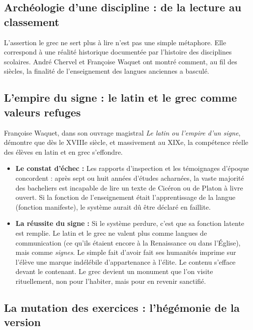 \subsection{Archéologie d'une discipline : de la lecture au classement}

L'assertion \og le grec ne sert plus à lire\fg{} n'est pas une simple métaphore. Elle correspond à
une réalité historique documentée par l'histoire des disciplines scolaires. André Chervel et
Françoise Waquet ont montré comment, au fil des siècles, la finalité de l'enseignement des langues
anciennes a basculé.



\subsection{L'empire du signe : le latin et le grec comme valeurs refuges}

Françoise Waquet, dans son ouvrage magistral \textit{Le latin ou l'empire d'un signe}, démontre que
dès le XVIIIe siècle, et massivement au XIXe, la compétence réelle des élèves en latin et en grec
s'effondre.

\begin{itemize}\item \textbf{Le constat d'échec :} Les rapports d'inspection et les témoignages d'époque concordent : après sept ou huit années d'études acharnées, la vaste majorité des bacheliers est incapable de lire un texte de Cicéron ou de Platon à livre ouvert.\cite{I-2-3-ref5} Si la fonction de l'enseignement était l'apprentissage de la langue (fonction manifeste), le système aurait dû être déclaré en faillite.\item \textbf{La réussite du signe :} Si le système perdure, c'est que sa fonction latente est remplie. Le latin et le grec ne valent plus comme langues de communication (ce qu'ils étaient encore à la Renaissance ou dans l'Église), mais comme \textit{signes}. Le simple fait d'avoir \og fait ses humanités\fg{} imprime sur l'élève une marque indélébile d'appartenance à l'élite. Le contenu s'efface devant le contenant. Le grec devient un \og monument\fg{} que l'on visite rituellement, non pour l'habiter, mais pour en revenir sanctifié.\cite{I-2-3-ref5}\end{itemize}

\subsection{La mutation des exercices : l'hégémonie de la version}

